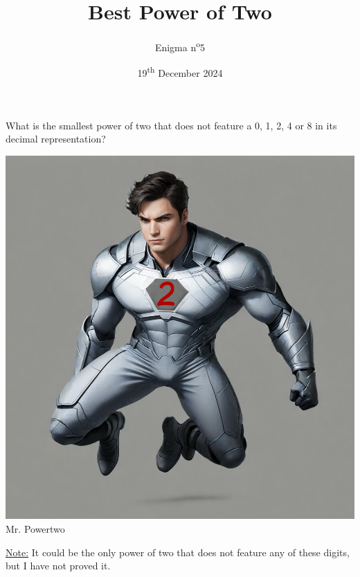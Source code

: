 \documentclass[a4paper, top=10mm]{article}
\title{\textbf{\huge{Best Power of Two}}}
\author{Enigma n\textsuperscript{o}5}
\date{19\textsuperscript{th} December 2024}
\begin{document}
	\maketitle
	
	What is the smallest power of two that does not feature a 0, 1, 2, 4 or 8 in its decimal representation?
	
	\begin{center}
		\includegraphics[width=\linewidth]{05best_power2bis.png}\\
		Mr. Powertwo
	\end{center}
	
	\underline{Note:} It could be the only power of two that does not feature any of these digits, but I have not proved it.
	
	
\end{document}
